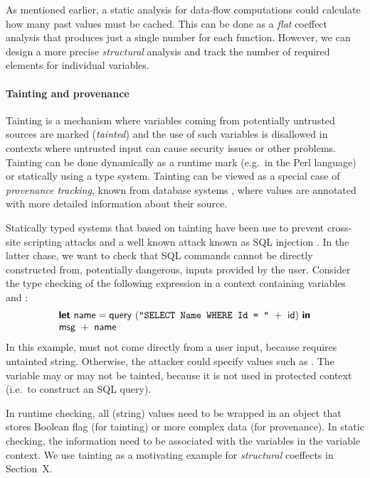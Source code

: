 As mentioned earlier, a static analysis for data-flow computations could calculate how many past 
values must be cached. This can be done as a \emph{flat} coeffect analysis that produces just a 
single number for each function. However, we can design a more precise \emph{structural} analysis
and track the number of required elements for individual variables.


\paragraph{Tainting and provenance}
Tainting is a mechanism where variables coming from potentially untrusted sources are marked
(\emph{tainted}) and the use of such variables is disallowed in contexts where untrusted input
can cause security issues or other problems. Tainting can be done dynamically as a runtime mark
(e.g.~in the Perl language) or statically using a type system. Tainting can be viewed as a special
case of \emph{provenance tracking}, known from database systems \cite{app-provenance-db}, where
values are annotated with more detailed information about their source.

Statically typed systems that based on tainting have been use to prevent cross-site scripting
attacks \cite{app-tainting-xss} and a well known attack known as SQL injection
\cite{app-tainting-sql,app-tainting-wasp}. In the latter chase, we want to check that SQL commands 
cannot be directly constructed from, potentially dangerous, inputs provided by the user. Consider the 
type checking of the following expression in a context containing variables  and :
%
\begin{equation*}
\begin{array}{l}
\kvd{let}~\ident{name} = \ident{query}~(\str{"SELECT Name WHERE Id = "}~+~\ident{id})~\kvd{in}\\
\ident{msg}~+~\ident{name}
\end{array}
\end{equation*}
%
In this example,  must not come directly from a user input, because  requires 
untainted string. Otherwise, the attacker could specify values such as . 
The variable  may or may not be tainted, because it is not used in protected context 
(i.e.~to construct an SQL query). 

In runtime checking, all (string) values need to be wrapped in an object that stores Boolean 
flag (for tainting) or more complex data (for provenance). In static checking, the information
need to be associated with the variables in the variable context. We use tainting as a motivating
example for \emph{structural} coeffects in Section~X.

